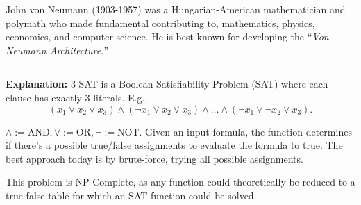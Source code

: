 \begin{Tip}
    John von Neumann (1903-1957) was a Hungarian-American mathematician and polymath who made fundamental contributing to, mathematics, physics, economics, and computer science. He is best known for developing the ``\textit{Von Neumann Architecture.}''
\end{Tip}

\newpage 

\begin{Func}[3-SAT]
    
        \label{3-SAT}
        \vspace{-.5em}
        \begin{algorithm}[H]
            \SetAlgoLined
        \end{algorithm}
        \noindent
        \rule{\textwidth}{0.4pt}
        \textbf{Explanation:} 3-SAT is a Boolean Satisfiability Problem (SAT) where each clause has exactly 3 literals. E.g.,
        $$ (x_1 \lor x_2 \lor x_3) \land (\neg x_1 \lor x_2 \lor x_3) \land \dots \land (\neg x_1 \lor \neg x_2 \lor x_3).$$

        \noindent
        $\land:=\text{AND}, \lor:=\text{OR}, \neg:=\text{NOT}$. Given an input formula, the function determines if there's a possible 
        true/false assignments to evaluate the formula to true. The best approach today is by brute-force, trying all possible assignments.

        This problem is NP-Complete, as any function could theoretically be reduced to a true-false table for which an SAT function could be solved.
        
\end{Func}

